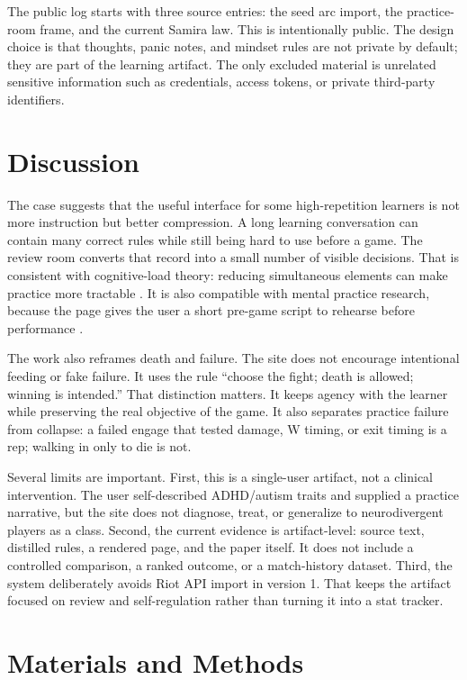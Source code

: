 \documentclass[12pt,letterpaper]{article}
\begin{document}
The public log starts with three source entries: the seed arc import, the practice-room frame, and the current Samira law. This is intentionally public. The design choice is that thoughts, panic notes, and mindset rules are not private by default; they are part of the learning artifact. The only excluded material is unrelated sensitive information such as credentials, access tokens, or private third-party identifiers.

\section{Discussion}

The case suggests that the useful interface for some high-repetition learners is not more instruction but better compression. A long learning conversation can contain many correct rules while still being hard to use before a game. The review room converts that record into a small number of visible decisions. That is consistent with cognitive-load theory: reducing simultaneous elements can make practice more tractable \cite{sweller1988}. It is also compatible with mental practice research, because the page gives the user a short pre-game script to rehearse before performance \cite{driskell1994}.

The work also reframes death and failure. The site does not encourage intentional feeding or fake failure. It uses the rule ``choose the fight; death is allowed; winning is intended.'' That distinction matters. It keeps agency with the learner while preserving the real objective of the game. It also separates practice failure from collapse: a failed engage that tested damage, W timing, or exit timing is a rep; walking in only to die is not.

Several limits are important. First, this is a single-user artifact, not a clinical intervention. The user self-described ADHD/autism traits and supplied a practice narrative, but the site does not diagnose, treat, or generalize to neurodivergent players as a class. Second, the current evidence is artifact-level: source text, distilled rules, a rendered page, and the paper itself. It does not include a controlled comparison, a ranked outcome, or a match-history dataset. Third, the system deliberately avoids Riot API import in version 1. That keeps the artifact focused on review and self-regulation rather than turning it into a stat tracker.

\section{Materials and Methods}
\end{document}
